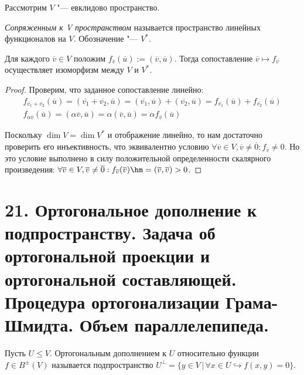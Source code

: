 Рассмотрим $V$ "--- евклидово пространство.

\begin{definition}
    \textit{Сопряженным к V пространством} называется пространство линейных функционалов на $V$. Обозначение "--- $V^*$.
\end{definition}

\begin{theorem}
    Для каждого $\overline{v} \in V$ положим $f_{\overline{v}}(\overline{u}) := (\overline{v}, \overline{u})$. Тогда сопоставление $\overline{v} \mapsto f_{\overline{v}}$ осуществляет изоморфизм между $V$ и $V^*$.
\end{theorem}

\begin{proof}
    Проверим, что заданное сопоставление линейно:
    \begin{gather*}
        f_{\overline{v_1} + \overline{v_2}}(\overline{u}) = (\overline{v_1} + \overline{v_2}, \overline{u}) = (\overline{v_1}, \overline{u}) + (\overline{v_2}, \overline{u}) = f_{\overline{v_1}}(\overline{u}) + f_{\overline{v_2}}(\overline{u})\\
        f_{\alpha\overline{v}}(\overline{u}) = (\alpha\overline{v}, \overline{u}) = \alpha(\overline{v}, \overline{u}) = \alpha f_{\overline{v}}(\overline{u})
    \end{gather*}
    
    Поскольку $\dim{V} = \dim{V^*}$ и отображение линейно, то нам достаточно проверить его инъективность, что эквивалентно условию $\forall \overline{v} \in V, \overline{v} \ne \overline{0}: f_{\overline{v}} \ne 0$. Но это условие выполнено в силу положительной определенности скалярного произведения: $\forall \overline{v} \in V, \overline{v} \ne \overline{0}: f_{\overline{v}}(\overline{v}) \hm= (\overline{v}, \overline{v}) > 0$.
\end{proof}

\section{21. Ортогональное дополнение к подпространству. Задача об ортогональной проекции и ортогональной составляющей. Процедура ортогонализации Грама-Шмидта. Объем параллелепипеда.}

\begin{definition}
    Пусть $U \leq V$. Ортогональным дополнением к $U$ относительно функции $f \in B^{\pm}(V)$ 
    называется подпространство $U^{\perp} = \{y \in V \,\vert \, \forall x \in U \hookrightarrow 
    f(x, y) = 0\}$.
\end{definition}


